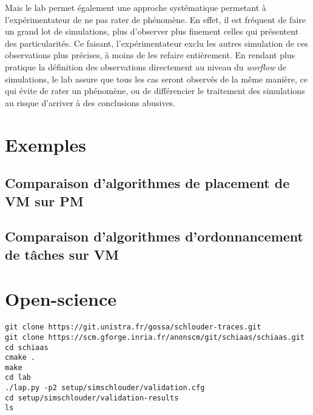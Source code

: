 \documentclass[parallelisme]{compas2017}
\begin{document}
Mais le lab permet également une approche systématique permetant à l'expérimentateur de ne pas rater 
de phénomène. En effet, il est fréquent de faire un grand lot de simulations, plus d'observer plus
finement celles qui présentent des particularités. Ce faisant, l'expérimentateur exclu les autres 
simulation de ces observations plus précises, à moins de les refaire entièrement. En rendant plus 
pratique la définition des observations directement au niveau du \textit{worflow} de simulations, 
le lab assure que tous les cas seront observés de la même manière, ce qui évite de rater un phénomène,
ou de différencier le traitement des simulations au risque d'arriver à des conclusions abusives.


\section{Exemples}

\subsection{Comparaison d'algorithmes de placement de VM sur PM}

\subsection{Comparaison d'algorithmes d'ordonnancement de tâches sur VM}

\section{Open-science}

\begin{verbatim}
git clone https://git.unistra.fr/gossa/schlouder-traces.git
git clone https://scm.gforge.inria.fr/anonscm/git/schiaas/schiaas.git 
cd schiaas
cmake .
make
cd lab
./lap.py -p2 setup/simschlouder/validation.cfg
cd setup/simschlouder/validation-results
ls
\end{verbatim}



\end{document}
